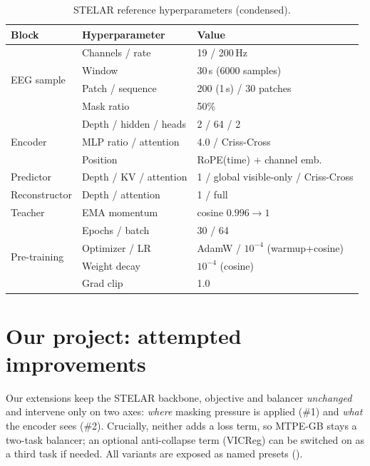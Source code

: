\documentclass[11pt]{article}
\begin{document}
\begin{table}[t]
\centering
\caption{STELAR reference hyperparameters (condensed).}
\label{tab:hparams}
\small
\begin{tabular}{lll}
\toprule
Block & Hyperparameter & Value \\
\midrule
\multirow{4}{*}{EEG sample}
  & Channels / rate & 19 / 200\,Hz \\
  & Window & 30\,s (6000 samples) \\
  & Patch / sequence & 200 (1\,s) / 30 patches \\
  & Mask ratio & 50\% \\
\midrule
\multirow{3}{*}{Encoder}
  & Depth / hidden / heads & 2 / 64 / 2 \\
  & MLP ratio / attention & 4.0 / Criss-Cross \\
  & Position & RoPE(time) + channel emb. \\
\midrule
Predictor & Depth / KV / attention & 1 / global visible-only / Criss-Cross \\
Reconstructor & Depth / attention & 1 / full \\
Teacher & EMA momentum & cosine $0.996 \to 1$ \\
\midrule
\multirow{4}{*}{Pre-training}
  & Epochs / batch & 30 / 64 \\
  & Optimizer / LR & AdamW / $10^{-4}$ (warmup+cosine) \\
  & Weight decay & $10^{-4}$ (cosine) \\
  & Grad clip & 1.0 \\
\bottomrule
\end{tabular}
\end{table}

\section{Our project: attempted improvements}
\label{sec:improvements}

Our extensions keep the STELAR backbone, objective and balancer \emph{unchanged}
and intervene only on two axes: \emph{where} masking pressure is applied (\#1) and
\emph{what} the encoder sees (\#2). Crucially, neither adds a loss term, so
MTPE-GB stays a two-task balancer; an optional anti-collapse term (VICReg) can be
switched on as a third task if needed. All variants are exposed as named presets
().
\end{document}
